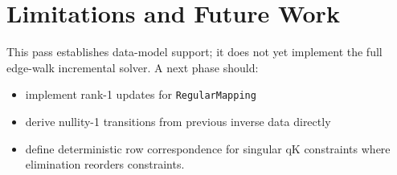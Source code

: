 \documentclass[11pt]{article}
\begin{document}
\section{Limitations and Future Work}
This pass establishes data-model support; it does not yet implement the full edge-walk incremental solver. A next phase should:
\begin{itemize}[leftmargin=2em]
\item implement rank-1 updates for \texttt{RegularMapping}
\item derive nullity-1 transitions from previous inverse data directly
\item define deterministic row correspondence for singular qK constraints where elimination reorders constraints.
\end{itemize}
\end{document}
